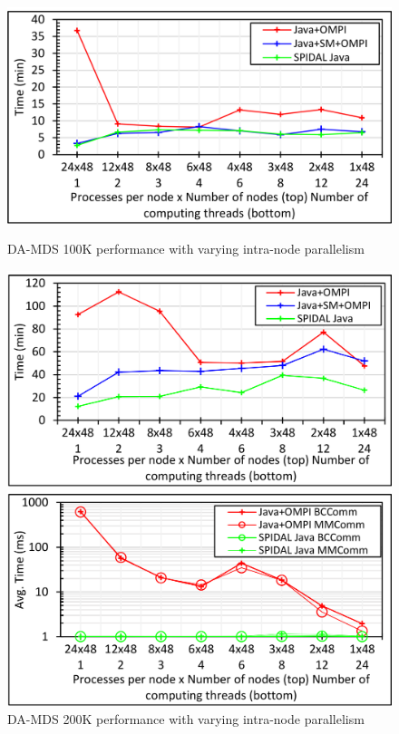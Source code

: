 \begin{figure}[!htb]
    \centering
    \begin{minipage}{.49\textwidth}
        \centering
        \includegraphics[width=0.85\columnwidth]{figures/fig_100K_TP}
        \caption{DA-MDS 100K performance with varying intra-node parallelism}
        \label{fig:fig_100K_TP}
    \end{minipage}%
    \begin{minipage}{0.49\textwidth}
        \centering
        \includegraphics[width=0.85\columnwidth]{figures/fig_200K_TP}
        \caption{DA-MDS 200K performance with varying intra-node parallelism}
        \label{fig:fig_200K_TP}
    \end{minipage} 
    \begin{minipage}{0.49\textwidth}
        \centering
        \includegraphics[width=0.85\columnwidth]{figures/fig_100K_TP_allgatherv}

\end{minipage}
\end{figure}
